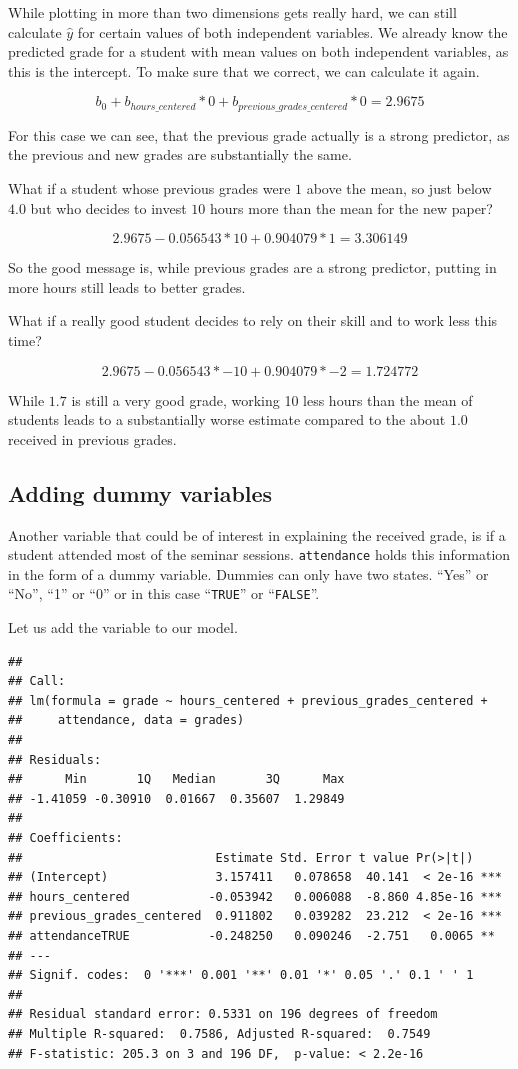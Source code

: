 \documentclass[
]{book}
\begin{document}
While plotting in more than two dimensions gets really hard, we can still
calculate \(\hat{y}\) for certain values of both independent variables.
We already know the predicted grade for a student with mean values on both
independent variables, as this is the intercept. To make sure that we correct,
we can calculate it again.

\[b_0 + b_{hours\_centered}*0 + b_{previous\_grades\_centered}*0 = 2.9675\]

For this case we can see, that the previous grade actually is a strong
predictor, as the previous and new grades are substantially the same.

What if a student whose previous grades were \(1\) above the mean, so just below
\(4.0\) but who decides to invest \(10\) hours more than the mean for the new paper?

\[2.9675 - 0.056543 * 10 + 0.904079 * 1 = 3.306149\]

So the good message is, while previous grades are a strong predictor, putting in
more hours still leads to better grades.

What if a really good student decides to rely on their skill and to work less
this time?

\[2.9675 - 0.056543 * -10 + 0.904079 * -2 = 1.724772\]

While \(1.7\) is still a very good grade, working 10 less hours than the mean of
students leads to a substantially worse estimate compared to the about \(1.0\)
received in previous grades.

\hypertarget{adding-dummy-variables}{%
\subsection{Adding dummy variables}\label{adding-dummy-variables}}

Another variable that could be of interest in explaining the received grade,
is if a student attended most of the seminar sessions.
\texttt{attendance} holds this information in the form of a dummy variable. Dummies can
only have two states. ``Yes'' or ``No'', ``1'' or ``0'' or in this case ``\texttt{TRUE}'' or
``\texttt{FALSE}''.

Let us add the variable to our model.

\begin{verbatim}
## 
## Call:
## lm(formula = grade ~ hours_centered + previous_grades_centered + 
##     attendance, data = grades)
## 
## Residuals:
##      Min       1Q   Median       3Q      Max 
## -1.41059 -0.30910  0.01667  0.35607  1.29849 
## 
## Coefficients:
##                           Estimate Std. Error t value Pr(>|t|)    
## (Intercept)               3.157411   0.078658  40.141  < 2e-16 ***
## hours_centered           -0.053942   0.006088  -8.860 4.85e-16 ***
## previous_grades_centered  0.911802   0.039282  23.212  < 2e-16 ***
## attendanceTRUE           -0.248250   0.090246  -2.751   0.0065 ** 
## ---
## Signif. codes:  0 '***' 0.001 '**' 0.01 '*' 0.05 '.' 0.1 ' ' 1
## 
## Residual standard error: 0.5331 on 196 degrees of freedom
## Multiple R-squared:  0.7586, Adjusted R-squared:  0.7549 
## F-statistic: 205.3 on 3 and 196 DF,  p-value: < 2.2e-16
\end{verbatim}
\end{document}
